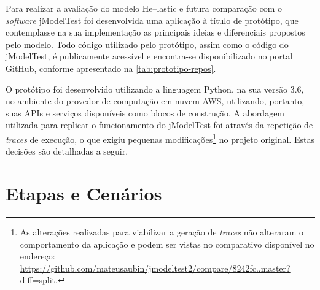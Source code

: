 \documentclass[english,brazilian]{UNISINOSmonografia} %
\begin{document}
Para realizar a avaliação do modelo \textsf{He}--lastic e futura comparação com o \textit{software} jModelTest foi desenvolvida uma aplicação à título de protótipo, que contemplasse na sua implementação as principais ideias e diferenciais propostos pelo modelo.
Todo código utilizado pelo protótipo, assim como o código do jModelTest, é publicamente acessível e encontra-se disponibilizado no portal GitHub, conforme apresentado na \autoref{tab:prototipo-repos}.


O protótipo foi desenvolvido utilizando a linguagem Python, na sua versão 3.6, no ambiente do provedor de computação em nuvem AWS, utilizando, portanto, suas APIs e serviços disponíveis como blocos de construção.
A abordagem utilizada para replicar o funcionamento do jModelTest foi através da repetição de \textit{traces} de execução, o que exigiu pequenas modificações\footnote{
	As alterações realizadas para viabilizar a geração de \textit{traces} não alteraram o comportamento da aplicação e podem ser vistas no comparativo disponível no endereço: \url{https://github.com/mateusaubin/jmodeltest2/compare/8242fc..master?diff=split}.
} no projeto original.
Estas decisões são detalhadas a seguir.








\section{Etapas e Cenários}
\label{sec:metodologia-etapasecenarios}
\end{document}
